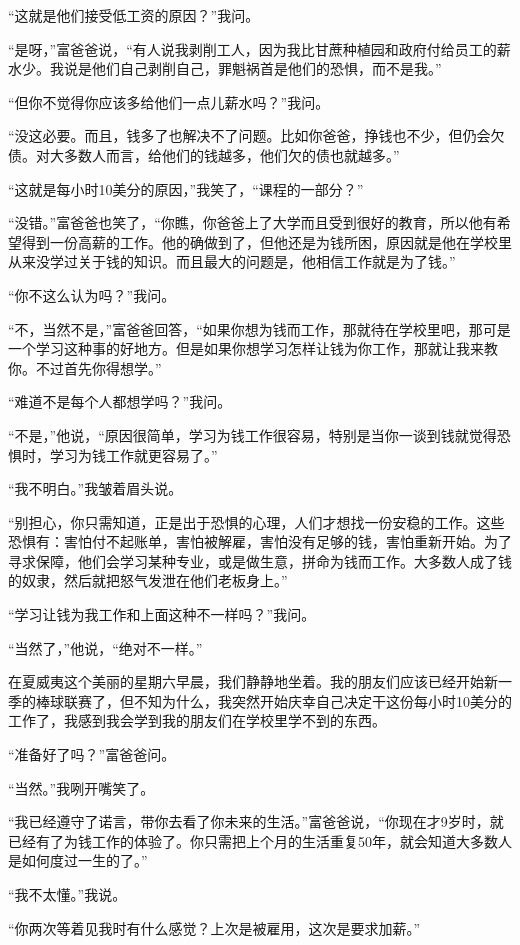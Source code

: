 “这就是他们接受低工资的原因？”我问。

“是呀，”富爸爸说，“有人说我剥削工人，因为我比甘蔗种植园和政府付给员工的薪水少。我说是他们自己剥削自己，罪魁祸首是他们的恐惧，而不是我。”

“但你不觉得你应该多给他们一点儿薪水吗？”我问。

“没这必要。而且，钱多了也解决不了问题。比如你爸爸，挣钱也不少，但仍会欠债。对大多数人而言，给他们的钱越多，他们欠的债也就越多。”

“这就是每小时10美分的原因，”我笑了，“课程的一部分？”

“没错。”富爸爸也笑了，“你瞧，你爸爸上了大学而且受到很好的教育，所以他有希望得到一份高薪的工作。他的确做到了，但他还是为钱所困，原因就是他在学校里从来没学过关于钱的知识。而且最大的问题是，他相信工作就是为了钱。”

“你不这么认为吗？”我问。

“不，当然不是，”富爸爸回答，“如果你想为钱而工作，那就待在学校里吧，那可是一个学习这种事的好地方。但是如果你想学习怎样让钱为你工作，那就让我来教你。不过首先你得想学。”

“难道不是每个人都想学吗？”我问。

“不是，”他说，“原因很简单，学习为钱工作很容易，特别是当你一谈到钱就觉得恐惧时，学习为钱工作就更容易了。”

“我不明白。”我皱着眉头说。

“别担心，你只需知道，正是出于恐惧的心理，人们才想找一份安稳的工作。这些恐惧有：害怕付不起账单，害怕被解雇，害怕没有足够的钱，害怕重新开始。为了寻求保障，他们会学习某种专业，或是做生意，拼命为钱而工作。大多数人成了钱的奴隶，然后就把怒气发泄在他们老板身上。”

“学习让钱为我工作和上面这种不一样吗？”我问。

“当然了，”他说，“绝对不一样。”

在夏威夷这个美丽的星期六早晨，我们静静地坐着。我的朋友们应该已经开始新一季的棒球联赛了，但不知为什么，我突然开始庆幸自己决定干这份每小时10美分的工作了，我感到我会学到我的朋友们在学校里学不到的东西。

“准备好了吗？”富爸爸问。

“当然。”我咧开嘴笑了。

“我已经遵守了诺言，带你去看了你未来的生活。”富爸爸说，“你现在才9岁时，就已经有了为钱工作的体验了。你只需把上个月的生活重复50年，就会知道大多数人是如何度过一生的了。”

“我不太懂。”我说。

“你两次等着见我时有什么感觉？上次是被雇用，这次是要求加薪。”

